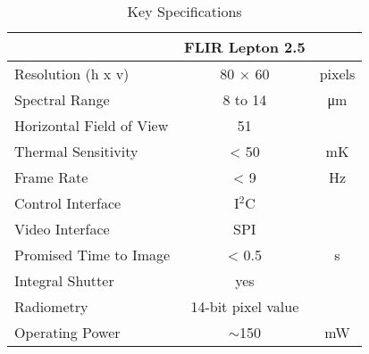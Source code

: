 \begin{table}[htb]
    \centering
    \label{tab:thcamspecifications}
    \caption{Key Specifications}
    \begin{tabular}{l c c}
        \hline
                                    &   FLIR Lepton 2.5 &          \\
        \hline
        \rowcolor{aliceblue!85} Resolution (h x v)	        &   80 $\times$ 60  &   pixels  \\
        Spectral Range	                                    &   8  to 14        &   \si{\micro\meter}   \\
        \rowcolor{aliceblue!85} Horizontal Field of View	&   51              &   \degree \\
        Thermal Sensitivity	        &   < 50                &   \si{\milli\kelvin}  \\
        \rowcolor{aliceblue!85} Frame Rate	                &   < 9             &   \si{\hertz} \\
        Control Interface	                                &   I$^{2}$C        &               \\
        \rowcolor{aliceblue!85} Video Interface	            &   SPI             &               \\
        Promised Time to Image	                            &   < 0.5           &   \si{\second}    \\
        \rowcolor{aliceblue!85} Integral Shutter		    &   yes             &   \\
        Radiometry	                                        &   14-bit pixel value  &           \\
        \rowcolor{aliceblue!85} Operating Power             &	$\sim$150       &   \si{\milli\watt} \\
        \hline
\end{tabular}
\end{table}
